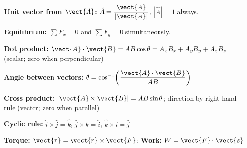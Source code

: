 \begin{summarybox}
\textbf{Unit vector from $\vect{A}$:}
$\hat{A} = \dfrac{\vect{A}}{|\vect{A}|}$,\quad
$|\hat{A}|=1$ always.

\textbf{Equilibrium:}
$\sum F_x = 0$ and $\sum F_y = 0$ simultaneously.

\textbf{Dot product:}
$\vect{A}\cdot\vect{B} = AB\cos\theta
= A_xB_x + A_yB_y + A_zB_z$
(scalar; zero when perpendicular)

\textbf{Angle between vectors:}
$\theta = \cos^{-1}\!\left(\dfrac{\vect{A}\cdot\vect{B}}{AB}\right)$

\textbf{Cross product:}
$|\vect{A}\times\vect{B}| = AB\sin\theta$;
direction by right-hand rule
(vector; zero when parallel)

\textbf{Cyclic rule:}
$\hat{i}\times\hat{j}=\hat{k}$,
$\hat{j}\times\hat{k}=\hat{i}$,
$\hat{k}\times\hat{i}=\hat{j}$

\textbf{Torque:} $\vect{\tau}=\vect{r}\times\vect{F}$;\quad
\textbf{Work:} $W=\vect{F}\cdot\vect{s}$

\end{summarybox}

\newpage

